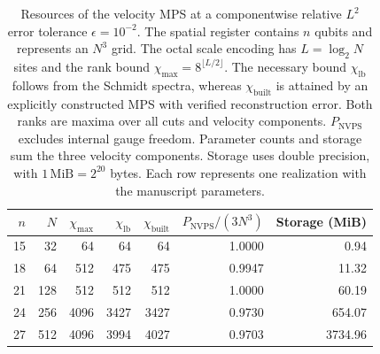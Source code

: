 \begin{table}[t]
\centering
\caption{Resources of the velocity MPS at a componentwise relative $L^2$ error tolerance $\epsilon=10^{-2}$.
The spatial register contains $n$ qubits and represents an $N^3$ grid.
The octal scale encoding has $L=\log_2N$ sites and the rank bound $\chi_{\max}=8^{\lfloor L/2\rfloor}$.
The necessary bound $\chi_{\mathrm{lb}}$ follows from the Schmidt spectra, whereas $\chi_{\mathrm{built}}$ is attained by an explicitly constructed MPS with verified reconstruction error.
Both ranks are maxima over all cuts and velocity components.
$P_{\mathrm{NVPS}}$ excludes internal gauge freedom.
Parameter counts and storage sum the three velocity components.
Storage uses double precision, with $1\,\mathrm{MiB}=2^{20}$ bytes.
Each row represents one realization with the manuscript parameters.}
\label{tab:velocity_mps_resources}
\begin{tabular}{rrrrrrr}
\hline\hline
$n$ & $N$ & $\chi_{\max}$ & $\chi_{\mathrm{lb}}$ & $\chi_{\mathrm{built}}$ & $P_{\mathrm{NVPS}}/(3N^3)$ & Storage (MiB) \\
\hline
15 & 32 & 64 & 64 & 64 & 1.0000 & 0.94 \\
18 & 64 & 512 & 475 & 475 & 0.9947 & 11.32 \\
21 & 128 & 512 & 512 & 512 & 1.0000 & 60.19 \\
24 & 256 & 4096 & 3427 & 3427 & 0.9730 & 654.07 \\
27 & 512 & 4096 & 3994 & 4027 & 0.9703 & 3734.96 \\
\hline\hline
\end{tabular}
\end{table}
